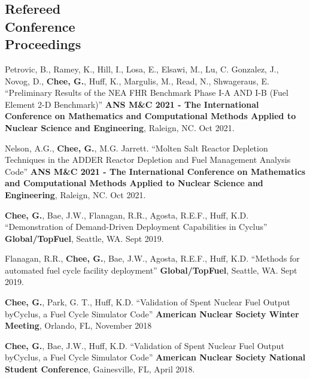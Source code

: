 \documentclass[margin,line]{resume}
\begin{document}
\begin{resume}
    \section{\mysidestyle Refereed\\Conference\\Proceedings}
    \begin{bibenum}
        \item Petrovic, B., Ramey, K., Hill, I., Losa, E., Elsawi, M., Lu, C. Gonzalez, J., 
        Novog, D., \textbf{Chee, G.}, Huff, K., Margulis, M., Read, N., Shwageraus, E. ``Preliminary Results of the NEA FHR Benchmark Phase I-A AND I-B (Fuel Element 2-D Benchmark)''
         \textbf{ANS M\&C 2021 - The International Conference on Mathematics and Computational Methods Applied 
         to Nuclear Science and Engineering}, Raleign, NC. Oct 2021.
        \item Nelson, A.G., \textbf{Chee, G.}, M.G. Jarrett. ``Molten Salt Reactor Depletion Techniques in the ADDER Reactor 
        Depletion and Fuel Management Analysis Code''
         \textbf{ANS M\&C 2021 - The International Conference on Mathematics and Computational Methods Applied 
         to Nuclear Science and Engineering}, Raleign, NC. Oct 2021.
    \item \textbf{Chee, G.}, Bae, J.W., Flanagan, R.R., Agosta, R.E.F., 
        Huff, K.D. ``Demonstration of Demand-Driven Deployment Capabilities in Cyclus''
         \textbf{Global/TopFuel}, Seattle, WA. Sept 2019.
    \item Flanagan, R.R., \textbf{Chee, G.}, Bae, J.W., Agosta, R.E.F., 
    Huff, K.D. ``Methods for automated fuel cycle facility deployment''
     \textbf{Global/TopFuel}, Seattle, WA. Sept 2019.
     \item \textbf{Chee, G.}, Park, G. T., 
    Huff, K.D. ``Validation of Spent Nuclear Fuel Output byCyclus, a Fuel Cycle Simulator Code''
     \textbf{American Nuclear Society Winter Meeting}, Orlando, FL, November 2018
     \item \textbf{Chee, G.}, Bae, J.W., 
    Huff, K.D. ``Validation of Spent Nuclear Fuel Output byCyclus, a Fuel Cycle Simulator Code''
     \textbf{ American Nuclear Society National Student Conference}, Gainesville, FL, April 2018.
    \end{bibenum}

\end{resume}
\end{document}

